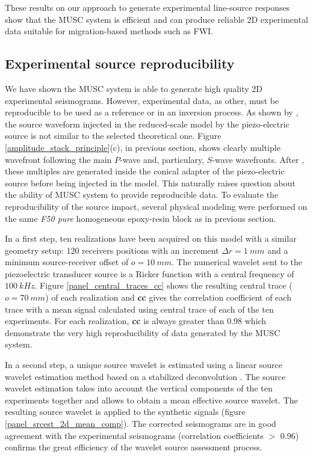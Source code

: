\documentclass[manuscript,revised]{geophysics}
\begin{document}
\noindent These results on our approach to generate experimental line-source responses show that the MUSC system is efficient and can produce reliable 2D experimental data suitable for migration-based methods such as FWI.


\subsection{Experimental source reproducibility}

\noindent We have shown the MUSC system is able to generate high quality 2D experimental seismograms. However, experimental data, as other, must be reproducible to be used as a reference or in an inversion process. As shown by \citet{Bretaudeau_SSM_2011}, the source waveform injected in the reduced-scale model by the piezo-electric source is not similar to the selected theoretical one. Figure \ref{amplitude_stack_principle}(c), in previous section, shows clearly multiple wavefront following the main $P$-wave and, particulary, $S$-wave wavefronts. After \citet{Bretaudeau_SSM_2011}, these multiples are generated inside the conical adapter of the piezo-electric source before being injected in the model. This naturally raises question about the ability of MUSC system to provide reproducible data. To evaluate the reproducibility of the source impact, several physical modeling were performed on the same \textit{F50 pure} homogeneous epoxy-resin block as in previous section. 

\noindent In a first step, ten realizations have been acquired on this model with a similar geometry setup: 120 receivers positions with an increment $\Delta r= 1\ mm$ and a minimum source-receiver offset of $o=10\ mm$. The numerical wavelet sent to the piezoelectric transducer source is a Ricker function with a central frequency of $100\ kHz$. Figure \ref{panel_central_traces_cc} shows the resulting central trace ($o=70\ mm$) of each realization and \textbf{cc} gives the correlation coefficient of each trace with a mean signal calculated using central trace of each of the ten experiments. For each realization, \textbf{cc} is always greater than 0.98 which demonstrate the very high reproducibility of data generated by the MUSC system.

\noindent In a second step, a unique source wavelet is estimated using a linear source wavelet estimation method based on a stabilized deconvolution \citep{Pratt_FWI_1999}. The source wavelet estimation takes into account the vertical components of the ten experiments together and allows to obtain a mean effective source wavelet. The resulting source wavelet is applied to the synthetic signals (figure \ref{panel_srcest_2d_mean_comp}). The corrected seismograms are in good agreement with the experimental seismograms (correlation coefficients $\mathrm{>}$ 0.96) confirms the great efficiency of the wavelet source assessment process.  
\end{document}
